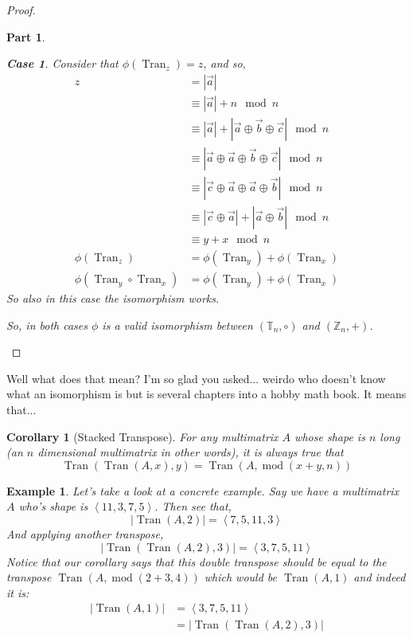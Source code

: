 \documentclass[12pt]{book}
\theoremstyle{definition}
\theoremstyle{plain}
\newtheorem{corollary}{Corollary}[theorem]
\newtheorem{example}{Example}[chapter]
\theoremstyle{ppart}
\newtheorem{ppart}{Part}
\theoremstyle{case}
\newtheorem{case}{Case}
\theoremstyle{solution}
\DeclareMathOperator{\Tran}{Tran}
\DeclareMathOperator{\remainder}{mod}
\begin{document}
\begin{proof}
\begin{ppart}
\begin{case}
Consider that $\phi(\Tran_z) = z$, and so,
\begin{align*}
  z
  &= |\vec{a}| \\
  &\equiv |\vec{a}| + n \mod n \\
  &\equiv |\vec{a}| + |\vec{a} \oplus \vec{b} \oplus \vec{c}| \mod n \\
  &\equiv |\vec{a} \oplus \vec{a} \oplus \vec{b} \oplus \vec{c}| \mod n \\
  &\equiv |\vec{c} \oplus \vec{a} \oplus \vec{a} \oplus \vec{b}| \mod n \\
  &\equiv |\vec{c} \oplus \vec{a}| + |\vec{a} \oplus \vec{b}| \mod n \\
  &\equiv y + x \mod n \\
  \phi(\Tran_z) &= \phi(\Tran_y) + \phi(\Tran_x) \\
  \phi(\Tran_y \circ \Tran_x) &= \phi(\Tran_y) + \phi(\Tran_x)
\end{align*}
So also in this case the isomorphism works.
\end{case}

So, in both cases $\phi$ is a valid isomorphism between $(\mathbb{T}_n, \circ)$
and $(\mathbb{Z}_n, +)$.
\end{ppart}
\end{proof}

Well what does that mean? I'm so glad you asked... weirdo who doesn't know what
an isomorphism is but is several chapters into a hobby math book. It means that...

\begin{corollary}[Stacked Transpose]
For any multimatrix $A$ whose shape is $n$ long (an $n$ dimensional multimatrix
in other words), it is always true that
\[ \Tran(\Tran(A, x),y) = \Tran(A, \remainder(x+y,n)) \]
\end{corollary}

\begin{example}
Let's take a look at a concrete example. Say we have a
multimatrix $A$ who's shape is $\left<11, 3, 7, 5\right>$. 
Then see that,
\[ |\Tran(A, 2)| = \left<7, 5, 11, 3\right> \]
And applying another transpose,
\[ |\Tran(\Tran(A, 2), 3)| = \left<3, 7, 5, 11\right> \]
Notice that our corollary says that this double transpose should be
equal to the transpose $\Tran(A, \remainder(2+3, 4))$ which would
be $\Tran(A, 1)$ and indeed it is:
\begin{align*}
  |\Tran(A, 1)|
  &= \left<3, 7, 5, 11\right> \\
  &= |\Tran(\Tran(A, 2), 3)|
\end{align*}
\end{example}
\end{document}
